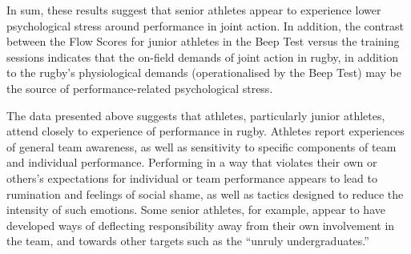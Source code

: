 \begin{CJK}{UTF8}{gbsn}
In sum, these results suggest that senior athletes appear to experience lower psychological stress around performance in joint action.  In addition, the contrast between the Flow Scores for junior athletes in the Beep Test versus the training sessions indicates that the on-field demands of joint action in rugby, in addition to the rugby's physiological demands (operationalised by the Beep Test) may be the source of performance-related psychological stress.










The data presented above suggests that athletes, particularly junior athletes, attend closely to experience of performance in rugby.  Athletes report experiences of general team awareness, as well as sensitivity to specific components of team and individual performance.
Performing in a way that violates their own or others's expectations for individual or team performance appears to lead to rumination and feelings of social shame, as well as tactics designed to reduce the intensity of such emotions.  Some senior athletes, for example, appear to have developed ways of deflecting responsibility away from their own involvement in the team, and towards other targets such as the ``unruly undergraduates.''



\end{CJK}

